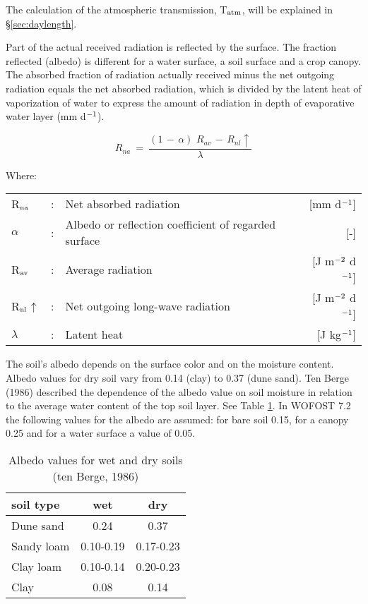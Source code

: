 The calculation of the atmospheric transmission, T$_{{\rm atm}}$, will be explained in 
\S \ref{sec:daylength}.

Part of the actual received radiation is reflected by the surface. The fraction reflected
(albedo) is different for a water surface, a soil surface and a crop canopy. The absorbed
fraction of radiation actually received minus the net outgoing radiation equals the net
absorbed radiation, which is divided by the latent heat of vaporization of water to express
the amount of radiation in depth of evaporative water layer (mm d$^{{\rm -1}}$).

\begin{equation}
\label{eq:AbsGlobRad}
R _{na} ~=~{\frac{(1\, -\, \alpha )\,\, R _{av} \, -\, R _{nl} \uparrow  }{\lambda}}
\end{equation}


Where:\\[5pt]
\begin{tabularx}{\textwidth}{llXr}
	R$_{{\rm na}}$ &:& Net absorbed radiation  & [mm d$^{{\rm -1}}$]\\
	$\alpha$ &:& Albedo or reflection coefficient of regarded surface  & [-]\\
	R$_{{\rm av}}$ &:& Average radiation  & [J m$^{{\rm -2}}$ d$^{{\rm -1}}$]\\
	R$_{{\rm nl}}$$\uparrow$ &:& Net outgoing long-wave radiation  & [J m$^{{\rm -2}}$ d$^{{\rm -1}}$]\\
	$\lambda$ &:& Latent heat  & [J kg$^{{\rm -1}}$]\\
\end{tabularx}


The soil's albedo depends on the surface color and on the moisture content. Albedo
values for dry soil vary from 0.14 (clay) to 0.37 (dune sand). Ten Berge (1986) described
the depen\-dence of the albedo value on soil moisture in relation to the average water
content of the top soil layer. See Table \ref{tab:AlbedoSoils}. 
In WOFOST 7.2 the following values for the albedo are assumed: for bare soil
0.15, for a canopy  0.25 and for a water surface a value of 0.05.

\begin{table}
	\centering
	\caption{Albedo values for wet and dry soils (ten Berge, 1986)}
	\label{tab:AlbedoSoils}
	\begin{tabular}{lcc}
		\hline
		soil type & wet & dry\\
		\hline
		Dune sand  &   0.24 &  0.37 \\
		Sandy loam &    0.10-0.19 &  0.17-0.23\\
		Clay loam &    0.10-0.14 &  0.20-0.23\\
		Clay &    0.08 &  0.14\\
		\hline
	\end{tabular}
\end{table}

